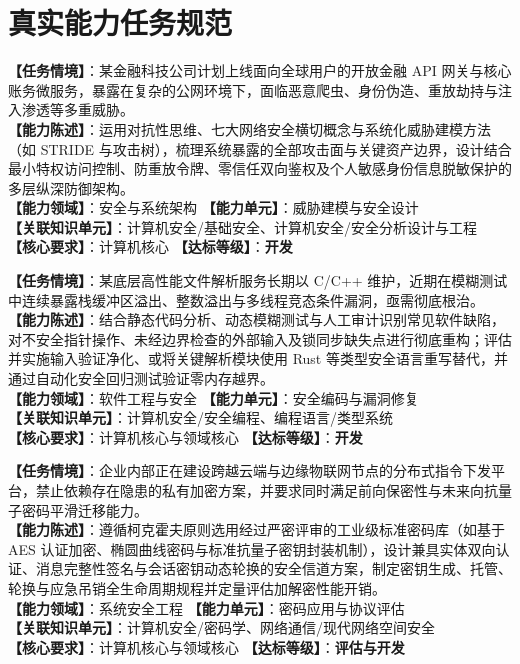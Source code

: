 \section{真实能力任务规范}

\begin{taskbox}[任务 1：核心业务系统全面威胁建模与对抗性防御架构设计]
\textbf{【任务情境】}：某金融科技公司计划上线面向全球用户的开放金融 API 网关与核心账务微服务，暴露在复杂的公网环境下，面临恶意爬虫、身份伪造、重放劫持与注入渗透等多重威胁。\\
\textbf{【能力陈述】}：运用对抗性思维、七大网络安全横切概念与系统化威胁建模方法（如 STRIDE 与攻击树），梳理系统暴露的全部攻击面与关键资产边界，设计结合最小特权访问控制、防重放令牌、零信任双向鉴权及个人敏感身份信息脱敏保护的多层纵深防御架构。\\
\textbf{【能力领域】}：安全与系统架构 \quad \textbf{【能力单元】}：威胁建模与安全设计\\
\textbf{【关联知识单元】}：计算机安全/基础安全、计算机安全/安全分析设计与工程\\
\textbf{【核心要求】}：计算机核心 \quad \textbf{【达标等级】}：\textbf{开发}
\end{taskbox}

\begin{taskbox}
\textbf{【任务情境】}：某底层高性能文件解析服务长期以 C/C++ 维护，近期在模糊测试中连续暴露栈缓冲区溢出、整数溢出与多线程竞态条件漏洞，亟需彻底根治。\\
\textbf{【能力陈述】}：结合静态代码分析、动态模糊测试与人工审计识别常见软件缺陷，对不安全指针操作、未经边界检查的外部输入及锁同步缺失点进行彻底重构；评估并实施输入验证净化、或将关键解析模块使用 Rust 等类型安全语言重写替代，并通过自动化安全回归测试验证零内存越界。\\
\textbf{【能力领域】}：软件工程与安全 \quad \textbf{【能力单元】}：安全编码与漏洞修复\\
\textbf{【关联知识单元】}：计算机安全/安全编程、编程语言/类型系统\\
\textbf{【核心要求】}：计算机核心与领域核心 \quad \textbf{【达标等级】}：\textbf{开发}
\end{taskbox}

\begin{taskbox}[任务 3：零信任端到端安全通信协议设计与密钥全生命周期管理]
\textbf{【任务情境】}：企业内部正在建设跨越云端与边缘物联网节点的分布式指令下发平台，禁止依赖存在隐患的私有加密方案，并要求同时满足前向保密性与未来向抗量子密码平滑迁移能力。\\
\textbf{【能力陈述】}：遵循柯克霍夫原则选用经过严密评审的工业级标准密码库（如基于 AES 认证加密、椭圆曲线密码与标准抗量子密钥封装机制），设计兼具实体双向认证、消息完整性签名与会话密钥动态轮换的安全信道方案，制定密钥生成、托管、轮换与应急吊销全生命周期规程并定量评估加解密性能开销。\\
\textbf{【能力领域】}：系统安全工程 \quad \textbf{【能力单元】}：密码应用与协议评估\\
\textbf{【关联知识单元】}：计算机安全/密码学、网络通信/现代网络空间安全\\
\textbf{【核心要求】}：计算机核心与领域核心 \quad \textbf{【达标等级】}：\textbf{评估与开发}
\end{taskbox}

